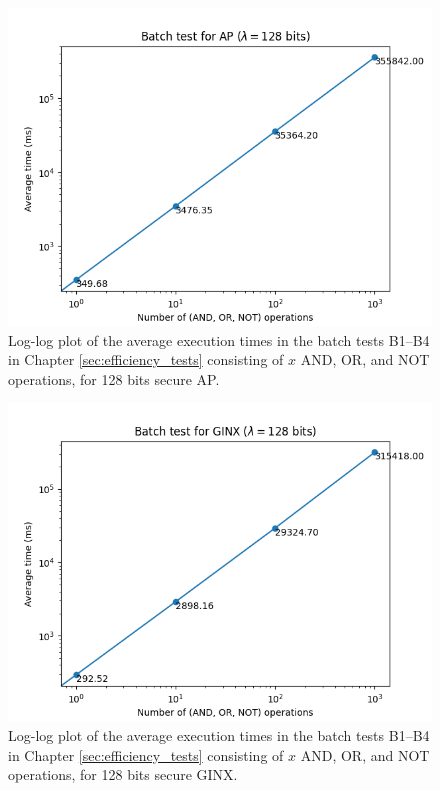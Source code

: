 \begin{figure}[ht]
    \centering
    \includegraphics[width=0.8\linewidth]{data/figures/AP_STD128_batch.png}
    \caption{Log-log plot of the average execution times in the batch tests B1--B4 in Chapter \ref{sec:efficiency_tests} consisting of $x$ AND, OR, and NOT operations, for 128 bits secure AP.}
    \label{fig:batch_ap128}
\end{figure}

\begin{figure}[ht]
    \centering
    \includegraphics[width=0.8\linewidth]{data/figures/GINX_STD128_batch.png}
    \caption{Log-log plot of the average execution times in the batch tests B1--B4 in Chapter \ref{sec:efficiency_tests} consisting of $x$ AND, OR, and NOT operations, for 128 bits secure GINX.}
    \label{fig:batch_ginx128}
\end{figure}

